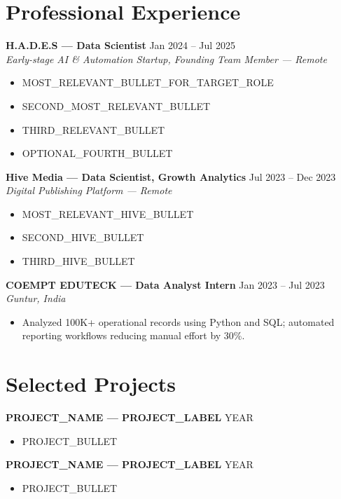 \documentclass[letterpaper,9pt]{article}
\begin{document}
	\section*{Professional Experience}

	\textbf{H.A.D.E.S --- Data Scientist} \hfill Jan 2024 -- Jul 2025 \\
	\textit{Early-stage AI \& Automation Startup, Founding Team Member --- Remote}
	\begin{itemize}
		\item MOST_RELEVANT_BULLET_FOR_TARGET_ROLE
		\item SECOND_MOST_RELEVANT_BULLET
		\item THIRD_RELEVANT_BULLET
		\item OPTIONAL_FOURTH_BULLET
	\end{itemize}

	\textbf{Hive Media --- Data Scientist, Growth Analytics} \hfill Jul 2023 -- Dec 2023 \\
	\textit{Digital Publishing Platform --- Remote}
	\begin{itemize}
		\item MOST_RELEVANT_HIVE_BULLET
		\item SECOND_HIVE_BULLET
		\item THIRD_HIVE_BULLET
	\end{itemize}

	\textbf{COEMPT EDUTECK --- Data Analyst Intern} \hfill Jan 2023 -- Jul 2023 \\
	\textit{Guntur, India}
	\begin{itemize}
		\item Analyzed 100K+ operational records using Python and SQL; automated reporting workflows reducing manual effort by 30\%.
	\end{itemize}


	\section*{Selected Projects}

	\textbf{PROJECT_NAME --- PROJECT_LABEL} \hfill YEAR
	\begin{itemize}
		\item PROJECT_BULLET
	\end{itemize}

	\textbf{PROJECT_NAME --- PROJECT_LABEL} \hfill YEAR
	\begin{itemize}
		\item PROJECT_BULLET
	\end{itemize}
\end{document}
